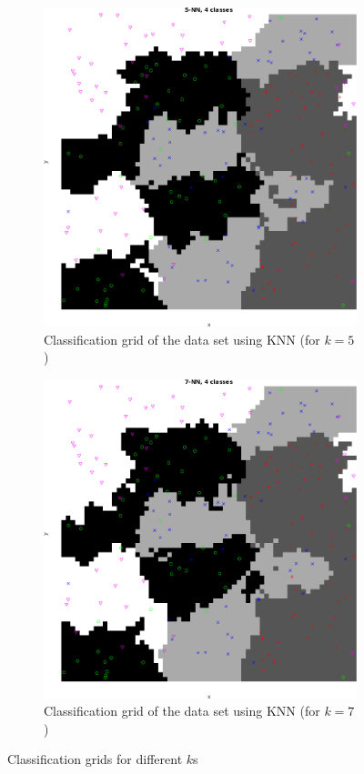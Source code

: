 \documentclass[10pt]{article}
\begin{document}
\begin{figure}[H]
  \begin{subfigure}{.49\textwidth}
    \includegraphics[width=.8\textwidth]{assign2_4_5.png}
    \caption{Classification grid of the data set using KNN (for $k=5$)}
    \label{fig2.4c}
  \end{subfigure}
  \begin{subfigure}{.49\textwidth}
    \includegraphics[width=.8\textwidth]{assign2_4_7.png}
    \caption{Classification grid of the data set using KNN (for $k=7$)}
    \label{fig2.4d}
  \end{subfigure}
  \caption{Classification grids for different $k$s}
  \label{fig2.4_a}
\end{figure}
\end{document}
